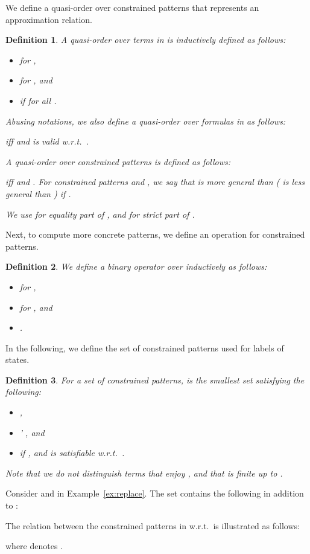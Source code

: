 \documentclass[copyright,creativecommons]{eptcs}
\newtheorem{definition}{Definition}
\newcommand{\cS}{\mathcal{S}}
\begin{document}
We define a quasi-order over constrained patterns 
that represents an approximation relation.
\begin{definition}
 \label{sqsubseteq}
 A quasi-order  over terms in
  is inductively defined as
 follows: 
 \begin{itemize}
  \item    for  
	,
  \item    for  
	, and
  \item    if 
         for all     .
 \end{itemize}


Abusing notations, we also define a quasi-order  over
 formulas in  as follows:
  
iff    and  is valid w.r.t.\ .


A quasi-order  over constrained patterns is defined as
 follows:
   
 iff    and   .
For constrained patterns  and , we say
 that  is \emph{more general} than 
 ( is \emph{less general} than ) if
   . 

We use  for equality part of , and
 for strict part of .
\end{definition}

Next, to compute more concrete patterns, we define an operation 
for constrained patterns.
\begin{definition}
We define a binary operator  over
  inductively as follows:
\begin{itemize}
 \item          for 
        , 
 \item        
        for   , and
 \item     . 
\end{itemize}
\end{definition}

In the following, we define the set of constrained patterns used for
labels of states.
\begin{definition}
For a set  of constrained patterns,  is the smallest set
 satisfying the following:
 \begin{itemize}
  \item 
	 ,
  \item \phi'\cS
	 ,
	and
  \item  if
	,   
	and  is satisfiable w.r.t.\ .
 \end{itemize}
Note that we do not distinguish terms that enjoy , and that
  is finite up to . 
\end{definition}
\begin{example}
 \label{ex:Inst}
Consider  and  in Example~\ref{ex:replace}.
The set 
 contains the following in addition to
 : 

The relation between the constrained patterns in 
 w.r.t.\  is illustrated as follows:

where  denotes .
\end{example}
\end{document}
